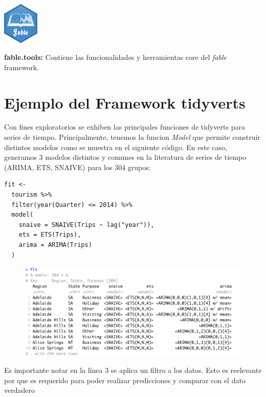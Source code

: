 \begin{minipage}{0.1\textwidth}
\hspace{\fill} 
\end{minipage}
\begin{minipage}{0.3\textwidth}
\includegraphics[height=2cm]{imgs/fable.png}
\end{minipage}
\begin{minipage}{0.5\textwidth}
\textbf{fable.tools:}  Contiene las funcionalidades y herramientas core del \textit{fable} framework.
\end{minipage}

\section{Ejemplo del Framework tidyverts }

Con fines exploratorios se exhiben las principales funciones de tidyverts para series de tiempo. Principalmente, tenemos la funcion \textit{Model} que permite construir distintos modelos como se muestra en el siguiente código. En este caso, generamos 3 modelos distintos y comunes en la literatura de series de  tiempo (ARIMA, ETS, SNAIVE) para los 304 grupos:

\begin{lstlisting}
fit <- 
  tourism %>%
  filter(year(Quarter) <= 2014) %>% 
  model(
    snaive = SNAIVE(Trips ~ lag("year")),
    ets = ETS(Trips),
    arima = ARIMA(Trips)
  )
\end{lstlisting}

\begin{figure}[!h]
        \includegraphics[width=120mm]{imgs/04_fit.png}
\end{figure}

Es importante notar en la línea 3 se aplica un filtro a los datos. Esto es reelevante por que es requerido para poder realizar predicciones y comparar con el dato verdadero


